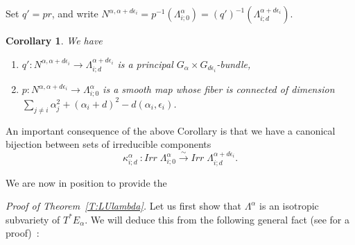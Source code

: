 \documentclass[a4paper,10pt]{amsart}
\def\a{\alpha}
\newtheorem{cor}[theo]{Corollary}
\numberwithin{equation}{section}
\begin{document}
\vspace{.1in}

Set $q'=pr$, and write $N^{\a,\a+d\epsilon_i}=p^{-1}(\Lambda^\a_{i;0})=(q')^{-1}(\Lambda^{\a+d\epsilon_i}_{i;d})$.

\vspace{.1in}

\begin{cor}\label{C:dimlambda} We have
\begin{enumerate}
\item[i)] $q': N^{\a,\a+d\epsilon_i} \to \Lambda^{\a+d\epsilon_i}_{i;d}$ is a principal $G_{\a} \times G_{d\epsilon_i}$-bundle,
\item[ii)] $p: N^{\a,\a+d\epsilon_i} \to \Lambda^{\a}_{i;0}$ is a smooth map whose fiber is connected of dimension $\sum_{j \neq i} \a_j^2 + (\a_i+d)^2-d(\a_i,\epsilon_i)$.
\end{enumerate}
\end{cor} 

\vspace{.1in}

An important consequence of the above Corollary is that we have a canonical bijection between sets of irreducible components 
\begin{equation}\label{E:bijcomp}
\kappa^{\a}_{i;d}~: Irr\;\Lambda^{\a}_{i;0} \stackrel{\sim}{\to} Irr\;\Lambda^{\a+d\epsilon_i}_{i;d}.
\end{equation}

We are now in position to provide the

\vspace{.1in}

\noindent
\textit{Proof of Theorem~\ref{T:LUlambda}.} Let us first show that $\Lambda^{\a}$ is an isotropic subvariety of $T^*E_{\a}$. We will deduce this from the following general fact (see \cite[Section~8.4]{KasShap} for a proof)~:
\end{document}
